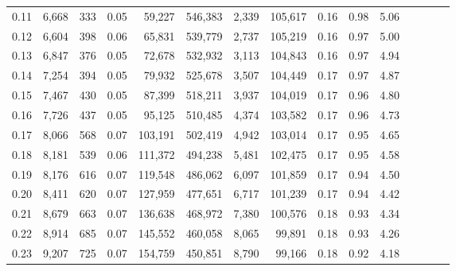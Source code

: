 \begin{tabular}{rrrcrrrrrrrrrrr}
0.11 &   6,668 &    333 &                                       0.05 &   59,227 &  546,383 &    2,339 &  105,617 &  0.16 &  0.98 &                         5.06 \\
0.12 &   6,604 &    398 &                                       0.06 &   65,831 &  539,779 &    2,737 &  105,219 &  0.16 &  0.97 &                         5.00 \\
0.13 &   6,847 &    376 &                                       0.05 &   72,678 &  532,932 &    3,113 &  104,843 &  0.16 &  0.97 &                         4.94 \\
0.14 &   7,254 &    394 &                                       0.05 &   79,932 &  525,678 &    3,507 &  104,449 &  0.17 &  0.97 &                         4.87 \\
0.15 &   7,467 &    430 &                                       0.05 &   87,399 &  518,211 &    3,937 &  104,019 &  0.17 &  0.96 &                         4.80 \\
0.16 &   7,726 &    437 &                                       0.05 &   95,125 &  510,485 &    4,374 &  103,582 &  0.17 &  0.96 &                         4.73 \\
0.17 &   8,066 &    568 &                                       0.07 &  103,191 &  502,419 &    4,942 &  103,014 &  0.17 &  0.95 &                         4.65 \\
0.18 &   8,181 &    539 &                                       0.06 &  111,372 &  494,238 &    5,481 &  102,475 &  0.17 &  0.95 &                         4.58 \\
0.19 &   8,176 &    616 &                                       0.07 &  119,548 &  486,062 &    6,097 &  101,859 &  0.17 &  0.94 &                         4.50 \\
0.20 &   8,411 &    620 &                                       0.07 &  127,959 &  477,651 &    6,717 &  101,239 &  0.17 &  0.94 &                         4.42 \\
0.21 &   8,679 &    663 &                                       0.07 &  136,638 &  468,972 &    7,380 &  100,576 &  0.18 &  0.93 &                         4.34 \\
0.22 &   8,914 &    685 &                                       0.07 &  145,552 &  460,058 &    8,065 &   99,891 &  0.18 &  0.93 &                         4.26 \\
0.23 &   9,207 &    725 &                                       0.07 &  154,759 &  450,851 &    8,790 &   99,166 &  0.18 &  0.92 &                         4.18 \\

\end{tabular}
